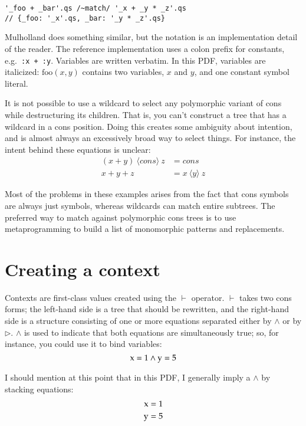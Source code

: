 \documentclass{report}
\def\rewrite {\vdash}
\begin{document}
\begin{verbatim}
'_foo + _bar'.qs /~match/ '_x + _y * _z'.qs
// {_foo: '_x'.qs, _bar: '_y * _z'.qs}
\end{verbatim}

    Mulholland does something similar, but the notation is an implementation detail of the reader. The reference implementation uses a colon prefix for constants, e.g.~{\tt :x + :y}. Variables
    are written verbatim. In this PDF, variables are italicized: $\textrm{foo}(x, y)$ contains two variables, $x$ and $y$, and one constant symbol literal.

    It is not possible to use a wildcard to select any polymorphic variant of cons while destructuring its children. That is, you can't construct a tree that has a wildcard in a cons position.
    Doing this creates some ambiguity about intention, and is almost always an excessively broad way to select things. For instance, the intent behind these equations is unclear:
\begin{align*}
(x + y)~\langle cons\rangle~z & = cons \\
x + y + z                     & = x~\langle y\rangle~z
\end{align*}

    Most of the problems in these examples arises from the fact that cons symbols are always just symbols, whereas wildcards can match entire subtrees. The preferred way to match against
    polymorphic cons trees is to use metaprogramming to build a list of monomorphic patterns and replacements.

\section{Creating a context}
    Contexts are first-class values created using the $\rewrite$ operator. $\rewrite$ takes two cons forms; the left-hand side is a tree that should be rewritten, and the right-hand side is a
    structure consisting of one or more equations separated either by $\wedge$ or by $\rhd$. $\wedge$ is used to indicate that both equations are simultaneously true; so, for instance, you
    could use it to bind variables:
    $$
      \textrm x = 1 \wedge \textrm y = 5
    $$

    I should mention at this point that in this PDF, I generally imply a $\wedge$ by stacking equations:
\begin{align*}
\textrm x & = 1 \\
\textrm y & = 5
\end{align*}
\end{document}
